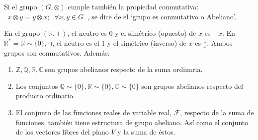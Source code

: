 \begin{defi}
Si el grupo $(G,\otimes)$ cumple también la propiedad conmutativa:
$\; \; x \otimes y = y \otimes x; \; \; \forall x,y \in G \; \; $,
se dice de el `grupo es conmutativo o Abeliano'. 
\end{defi}
\begin{ejem}
	En el grupo $(\mathbb R, +)$, el neutro es $0$ y el simétrico (opuesto) de $x$ es $-x$. En $\mathbb R^*=\mathbb R \sim \{0\}, \cdot)$, el neutro es el $1$ y el simétrico (inverso) de $x$ es $\frac 1 x$. Ambos grupos son conmutativos. Además:
	\vspace{-2mm}
	\begin{enumerate}
	\item $\mathbb Z, \mathbb Q, \mathbb R, \mathbb C \ $son grupos abelianos respecto de la suma ordinaria.
	\item Los conjuntos 	$\mathbb Q \sim \{0\}, \mathbb R \sim \{0\}, \mathbb C \sim \{0\}$ son grupos abelianos respecto del producto ordinario.
	\item El conjunto de las funciones reales de variable real, $\mathcal F$, respecto de la suma de funciones, también tiene estructura de grupo abeliano. Así como el conjunto de los vectores libres del plano $V$ y la suma de éstos.
	\end{enumerate}
\end{ejem}

